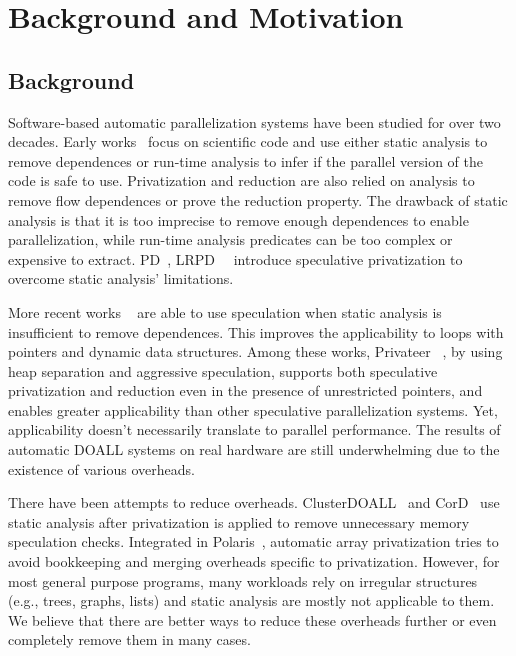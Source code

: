 \section{Background and Motivation}
\label{sec:motivation}


\subsection{Background}
Software-based automatic parallelization systems have been studied for over
two decades.
%
Early works~\cite{blume:94:polaris,suif:94:stanford,rus:03:hybrid} focus on
scientific code and use either static analysis to remove dependences or
run-time analysis to infer if the parallel version of the code is safe to
use. Privatization and reduction are also relied on analysis to remove flow
dependences or prove the reduction property. The drawback of static
analysis is that it is too imprecise to remove enough dependences to enable
parallelization, while run-time analysis predicates can be too complex or
expensive to extract. PD~\cite{rauchwerger:94:ics},
LRPD~~\cite{dang:02:ipdps} introduce
speculative privatization to overcome static analysis' limitations.

More recent works ~\cite{mehrara:09:stmlite,kim:12:cgo,johnson:12:pldi} are
able to use speculation when static analysis is insufficient to remove
dependences. This improves the applicability to loops with pointers and
dynamic data structures.  Among these works, Privateer
~\cite{johnson:12:pldi}, by using heap separation and aggressive
speculation, supports both speculative privatization and reduction even in
the presence of unrestricted pointers, and enables greater applicability
than other speculative parallelization systems.  Yet, applicability doesn't
necessarily translate to parallel performance. The results of automatic
DOALL systems on real hardware are still underwhelming due to the existence
of various overheads.

There have been attempts to reduce overheads.
ClusterDOALL~\cite{kim:12:cgo} and CorD~\cite{ctian:2008:micro} use static
analysis after privatization is applied to remove unnecessary memory
speculation checks. Integrated in Polaris~\cite{blume:94:polaris}, automatic
array privatization\cite{tu:94:lcpc} tries to avoid bookkeeping and merging
overheads specific to privatization. However, for most general purpose
programs, many workloads rely on irregular structures (e.g., trees, graphs,
lists) and static analysis are mostly not applicable to them. We believe
that there are better ways to reduce these overheads further or even
completely remove them in many cases.

